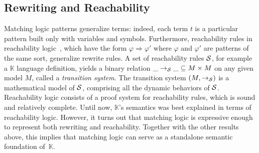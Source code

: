 \documentclass[UTF8,11pt]{article}
\theoremstyle{plain}
\theoremstyle{definition}
\theoremstyle{remark}
\newcommand{\K}{\mbox{$\mathbb{K}$}\xspace}
\newcommand{\ra}{\rightarrow}
\begin{document}
\subsection{Rewriting and Reachability}
\label{sec:rewriting}

Matching logic patterns generalize terms: indeed, each term $t$ is a
particular pattern built only with variables and symbols.
Furthermore, reachability rules in reachability
logic~\cite{rosu-stefanescu-ciobaca-moore-2013-lics,stefanescu-ciobaca-mereuta-moore-serbanuta-rosu-2014-rta},
which have the form $\varphi \Rightarrow \varphi'$ where $\varphi$ and $\varphi'$
are patterns of the same sort, generalize rewrite rules.
A set of reachability rules $\cal S$, for example a \K language
definition, yields a binary relation $\_\ra_{\cal S}\_ \subseteq M \times M$
on any given model $M$, called a \emph{transition system}.
The transition system $(M,\ra_{\cal S})$ is a mathematical model of $\cal S$,
comprising all the dynamic behaviors of $\cal S$.
Reachability logic consists of a proof system for reachability rules,
which is sound and relatively complete.
Until now, \K's semantics was best explained in terms of reachability logic.
However, it turns out that matching logic is expressive enough to represent
both rewriting and reachability.
Together with the other results above, this implies that matching
logic can serve as a standalone semantic foundation of~$\K$.
\end{document}
